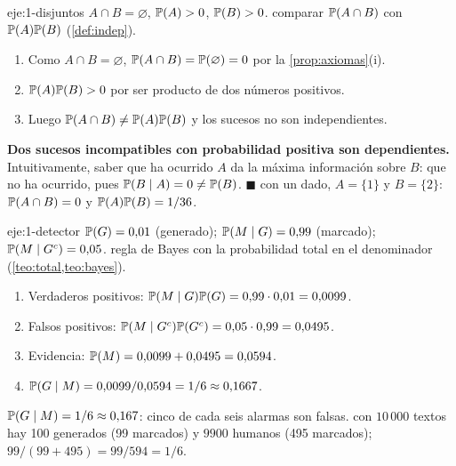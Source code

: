 \begin{solucion}{eje:1-disjuntos}
\datos $A\cap B=\varnothing$, $\mathbb{P}(A)>0$, $\mathbb{P}(B)>0$.
\planteamiento comparar $\mathbb{P}(A\cap B)$ con $\mathbb{P}(A)\mathbb{P}(B)$ (\cref{def:indep}).
\pasos
\begin{enumerate}[label=\arabic*.]
  \item Como $A\cap B=\varnothing$, $\mathbb{P}(A\cap B)=\mathbb{P}(\varnothing)=0$ por la \cref{prop:axiomas}(i).
  \item $\mathbb{P}(A)\mathbb{P}(B)>0$ por ser producto de dos números positivos.
  \item Luego $\mathbb{P}(A\cap B)\ne\mathbb{P}(A)\mathbb{P}(B)$ y los sucesos no son independientes.
\end{enumerate}
\resultado \textbf{Dos sucesos incompatibles con probabilidad positiva son dependientes.} Intuitivamente, saber que ha ocurrido $A$ da la máxima información sobre $B$: que no ha ocurrido, pues $\mathbb{P}(B\mid A)=0\ne\mathbb{P}(B)$. $\blacksquare$
\comprobacion con un dado, $A=\{1\}$ y $B=\{2\}$: $\mathbb{P}(A\cap B)=0$ y $\mathbb{P}(A)\mathbb{P}(B)=1/36$.
\end{solucion}

\begin{solucion}{eje:1-detector}
\datos $\mathbb{P}(G)=0{,}01$ (generado); $\mathbb{P}(M\mid G)=0{,}99$ (marcado); $\mathbb{P}(M\mid G^{c})=0{,}05$.
\planteamiento regla de Bayes con la probabilidad total en el denominador (\cref{teo:total,teo:bayes}).
\pasos
\begin{enumerate}[label=\arabic*.]
  \item Verdaderos positivos: $\mathbb{P}(M\mid G)\mathbb{P}(G)=0{,}99\cdot 0{,}01=0{,}0099$.
  \item Falsos positivos: $\mathbb{P}(M\mid G^{c})\mathbb{P}(G^{c})=0{,}05\cdot 0{,}99=0{,}0495$.
  \item Evidencia: $\mathbb{P}(M)=0{,}0099+0{,}0495=0{,}0594$.
  \item $\mathbb{P}(G\mid M)=0{,}0099/0{,}0594=1/6\approx 0{,}1667$.
\end{enumerate}
\resultado \textbf{$\mathbb{P}(G\mid M)=1/6\approx 0{,}167$}: cinco de cada seis alarmas son falsas.
\comprobacion con $10\,000$ textos hay 100 generados (99 marcados) y $9900$ humanos (495 marcados); $99/(99+495)=99/594=1/6$.
\end{solucion}


